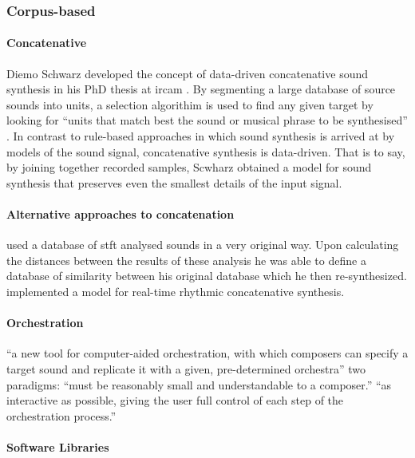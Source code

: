 \subsubsection{Corpus-based}
{
	\paragraph{Concatenative}

	Diemo Schwarz developed the concept of data-driven concatenative sound synthesis in his PhD thesis at \gls{ircam} \parencite{Schwarz2000, icmc/bbp2372.2003.099, Sch06:How}. By segmenting a large database of source sounds into units, a selection algorithim is used to find any given target by looking for ``units that match best the sound or musical phrase to be synthesised'' \parencite{Sch06:How}. In contrast to rule-based approaches in which sound synthesis is arrived at by models of the sound signal, concatenative synthesis is data-driven. That is to say, by joining together recorded samples, Scwharz obtained a model for sound synthesis that preserves even the smallest details of the input signal.

	\paragraph{Alternative approaches to concatenation}

	\citeauthor{icmc/bbp2372.2003.052} \parencite{icmc/bbp2372.2003.052} used a database of \gls{stft} analysed sounds in a very original way. Upon calculating the distances between the results of these analysis he was able to define a database of similarity between his original database which he then re-synthesized. \citeauthor{Nuannicode225in2016} \parencite{Nuannicode225in2016} implemented a model for real-time rhythmic concatenative synthesis. 

	\paragraph{Orchestration}
	``a new tool for computer-aided orchestration, with which composers can specify a target sound and replicate it with a given, pre-determined orchestra'' \parencite{gregoire_carpentier_2006_849343}
	two paradigms:
	``must be reasonably small and understandable to a composer.''
	``as interactive as possible, giving the user full control of each step of the orchestration process.''

	\paragraph{Software Libraries}

}
